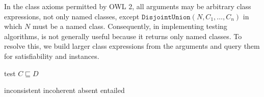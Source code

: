 \documentclass[paper.tex]{subfiles}
\begin{document}
In the class axioms permitted by OWL 2, all arguments may be arbitrary class expressions, not only named classes, except $\mathtt{DisjointUnion}(N, C_1, \ldots, C_n)$ in which $N$ must be a named class.  Consequently, in implementing testing algorithms,  is not generally useful because it returns only named classes.  To resolve this, we build larger class expressions from the arguments and query them for satisfiability and instances.

\begin{algorithm}[H]
  \caption{test $C \sqsubseteq D$}
  \begin{algorithmic}[1]
    \raggedright
        \State \Return inconsistent
        \label{alg:testSubClassOf:returnInconsistent}
        \State \Return incoherent
        \label{alg:testSubClassOf:returnIncoherent}
        \State \Return absent
      \Else
        \State \Return entailed
        \label{alg:testSubClassOf:returnEntailed}
      \EndIf
    \EndFunction
  \end{algorithmic}
\end{algorithm}
\end{document}
